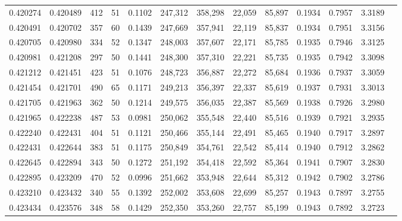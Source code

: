\begin{tabular}{rrrrrrrrrrrrr}
0.420274 & 0.420489 &   412 &  51 &                                     0.1102 & 247,312 & 358,298 &  22,059 &  85,897 & 0.1934 & 0.7957 & 3.3189 \\
0.420491 & 0.420702 &   357 &  60 &                                     0.1439 & 247,669 & 357,941 &  22,119 &  85,837 & 0.1934 & 0.7951 & 3.3156 \\
0.420705 & 0.420980 &   334 &  52 &                                     0.1347 & 248,003 & 357,607 &  22,171 &  85,785 & 0.1935 & 0.7946 & 3.3125 \\
0.420981 & 0.421208 &   297 &  50 &                                     0.1441 & 248,300 & 357,310 &  22,221 &  85,735 & 0.1935 & 0.7942 & 3.3098 \\
0.421212 & 0.421451 &   423 &  51 &                                     0.1076 & 248,723 & 356,887 &  22,272 &  85,684 & 0.1936 & 0.7937 & 3.3059 \\
0.421454 & 0.421701 &   490 &  65 &                                     0.1171 & 249,213 & 356,397 &  22,337 &  85,619 & 0.1937 & 0.7931 & 3.3013 \\
0.421705 & 0.421963 &   362 &  50 &                                     0.1214 & 249,575 & 356,035 &  22,387 &  85,569 & 0.1938 & 0.7926 & 3.2980 \\
0.421965 & 0.422238 &   487 &  53 &                                     0.0981 & 250,062 & 355,548 &  22,440 &  85,516 & 0.1939 & 0.7921 & 3.2935 \\
0.422240 & 0.422431 &   404 &  51 &                                     0.1121 & 250,466 & 355,144 &  22,491 &  85,465 & 0.1940 & 0.7917 & 3.2897 \\
0.422431 & 0.422644 &   383 &  51 &                                     0.1175 & 250,849 & 354,761 &  22,542 &  85,414 & 0.1940 & 0.7912 & 3.2862 \\
0.422645 & 0.422894 &   343 &  50 &                                     0.1272 & 251,192 & 354,418 &  22,592 &  85,364 & 0.1941 & 0.7907 & 3.2830 \\
0.422895 & 0.423209 &   470 &  52 &                                     0.0996 & 251,662 & 353,948 &  22,644 &  85,312 & 0.1942 & 0.7902 & 3.2786 \\
0.423210 & 0.423432 &   340 &  55 &                                     0.1392 & 252,002 & 353,608 &  22,699 &  85,257 & 0.1943 & 0.7897 & 3.2755 \\
0.423434 & 0.423576 &   348 &  58 &                                     0.1429 & 252,350 & 353,260 &  22,757 &  85,199 & 0.1943 & 0.7892 & 3.2723 \\

\end{tabular}
